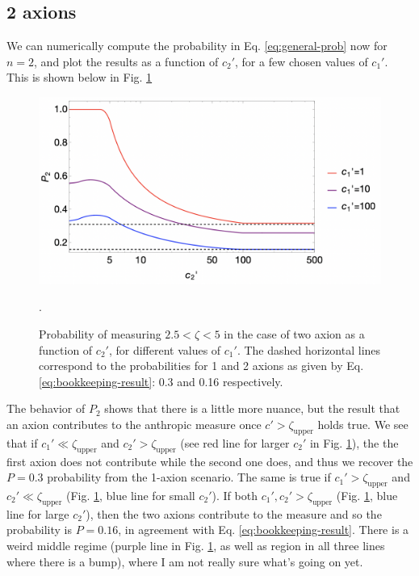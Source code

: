 \documentclass{article}
\begin{document}
\subsection{2 axions}
\label{subsec:2-axions}

We can numerically compute the probability in Eq. \eqref{eq:general-prob} now for $n=2$, and plot the results as a function of $c_2'$, for a few chosen values of $c_1'$. This is shown below in Fig. \ref{fig:2axion-prob}

\begin{figure}[h]
    \includegraphics[scale=0.5]{figs/2axion-prob.jpeg}
    \centering
    \caption{Probability of measuring $2.5<\zeta<5$ in the case of two axion as a function of $c_2'$, for different values of $c_1'$. The dashed horizontal lines correspond to the probabilities for 1 and 2 axions as given by Eq. \eqref{eq:bookkeeping-result}: 0.3 and 0.16 respectively.}.
    \label{fig:2axion-prob}
\end{figure}

The behavior of $P_2$ shows that there is a little more nuance, but the result that an axion contributes to the anthropic measure once $c'>\zeta_\text{upper}$ holds true. We see that if $c_1'\ll\zeta_\text{upper}$ and $c_2'>\zeta_\text{upper}$ (see red line for larger $c_2'$ in Fig. \ref{fig:2axion-prob}), the the first axion does not contribute while the second one does, and thus we recover the $P=0.3$ probability from the 1-axion scenario. The same is true if $c_1'>\zeta_\text{upper}$ and $c_2'\ll\zeta_\text{upper}$ (Fig. \ref{fig:2axion-prob}, blue line for small $c_2'$). If both $c_1',c_2'>\zeta_\text{upper}$ (Fig. \ref{fig:2axion-prob}, blue line for large $c_2'$), then the two axions contribute to the measure and so the probability is $P=0.16$, in agreement with Eq. \eqref{eq:bookkeeping-result}. There is a weird middle regime (purple line in Fig. \ref{fig:2axion-prob}, as well as region in all three lines where there is a bump), where I am not really sure what's going on yet. 
\end{document}

